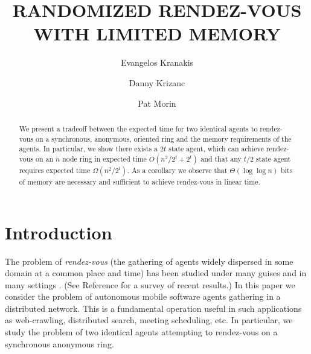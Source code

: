 \documentclass[lotsofwhite]{patmorin}
\title{\MakeUppercase{Randomized Rendez-Vous with Limited Memory}}
\author{Evangelos Kranakis \and
	Danny Krizanc \and
	Pat Morin}
\begin{document}
\maketitle
\begin{abstract}
We present a tradeoff between the expected time for two identical
agents to rendez-vous on a synchronous, anonymous, oriented
ring and the memory requirements of the agents. In particular, we show 
there exists a $2t$ state agent, which
can achieve rendez-vous on an $n$ node ring in expected time
$O( n^2/2^{t} + 2^{t} )$ and that any $t/2$ state agent
requires expected time $\Omega( n^2/2^t )$. 
As a corollary we observe that $\Theta(\log \log n)$ bits of
memory are necessary and 
sufficient to achieve rendez-vous in linear time. 
\end{abstract}

\section{Introduction}

The problem of {\em rendez-vous} (the gathering of agents widely
dispersed in some domain at a common place and time) has been studied
under many guises and in many settings
\cite{alpernGal03,Marco,dessmark,dobrev,fkkss,fkklss,gakra,kowalski1,
kowalski2,kkss,markou,RoyDudek,sawchuk04,Yamashita,yu}.  (See
Reference \cite{kkr} for a survey of recent results.) In this paper we
consider the problem of autonomous mobile software agents gathering in
a distributed network. This is a fundamental operation useful in such
applications as web-crawling, distributed search, meeting scheduling,
etc. In particular, we study the problem of two identical agents
attempting to rendez-vous on a synchronous anonymous ring.
\end{document}
